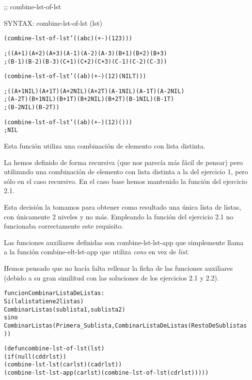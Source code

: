 \begin{aibox}{\function}
;; combine-lst-of-lst

SYNTAX: combine-lst-of-lst (lst)
\end{aibox}

\begin{aibox}{\examples}
\begin{alltt}
 (combine-lst-of-lst '((a b c) (+ -) (1 2 3)))

;((A + 1) (A + 2) (A + 3) (A - 1) (A - 2) (A - 3) (B + 1) (B + 2) (B + 3)
; (B - 1) (B - 2) (B - 3) (C + 1) (C + 2) (C + 3) (C - 1) (C - 2) (C - 3))

(combine-lst-of-lst '((a b) (+ -) (1 2) (NIL T)))

; ((A + 1 NIL) (A + 1 T) (A + 2 NIL) (A + 2 T) (A - 1 NIL) (A - 1 T) (A - 2 NIL)
; (A - 2 T) (B + 1 NIL) (B + 1 T) (B + 2 NIL) (B + 2 T) (B - 1 NIL) (B - 1 T)
; (B - 2 NIL) (B - 2 T))

(combine-lst-of-lst '((a b) (+ -) (1 2) ()))
; NIL
\end{alltt}

\end{aibox}

\begin{aibox}{\comments}
Esta función utiliza una combinación de elemento con lista distinta. 

La hemos definido de forma recursiva (que nos parecía más fácil de pensar) pero utilizando una combinación de elemento con lista distinta a la del ejercicio 1, pero sólo en el caso recursivo. En el caso base hemos mantenido la función del ejercicio 2.1. 

Esta decisión la tomamos para obtener como resultado una única lista de listas, con únicamente 2 niveles y no más. Empleando la función del ejercicio 2.1 no funcionaba correctamente este requisito.

Las funciones auxiliares definidas son combine-lst-lst-app que simplemente llama a la función combine-elt-lst-app que utiliza \emph{cons} en vez de \emph{list}.

Hemos pensado que no hacía falta rellenar la ficha de las funciones auxiliares (debido a su gran similitud con las soluciones de los ejercicios 2.1 y 2.2).

\end{aibox}
\begin{aibox}{\pseudocode}
\begin{alltt}
funcion CombinarListaDeListas:
	Si (la lista tiene 2 listas)
		CombinarListas(sublista1,sublista2)
	sino
		CombinarListas (Primera\_Sublista, CombinarListaDeListas (RestoDeSublistas))
\end{alltt}
\end{aibox}
\begin{aibox}{\code}

\begin{alltt}
(defun combine-lst-of-lst (lst)
    (if (null (cddr lst))
            (combine-lst-lst (car lst) (cadr lst))
    (combine-lst-lst-app (car lst) (combine-lst-of-lst (cdr lst)))))

\end{alltt}
\end{aibox}
